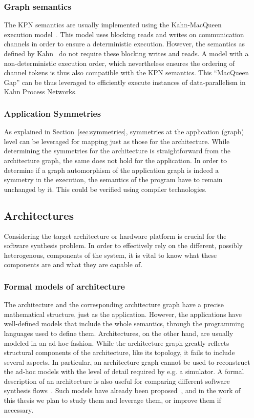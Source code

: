 \documentclass[sigplan,10pt]{acmart}
\begin{document}
\subsubsection{Graph semantics}
The KPN semantics are usually implemented using the Kahn-MacQueen execution model~\cite{kahnmacqueen}. This model uses blocking reads and writes on communication channels in order to ensure a deterministic execution.
However, the semantics as defined by Kahn~\cite{kahn74} do not require these blocking writes and reads. A model with a non-deterministic execution order, which nevertheless ensures the ordering of channel tokens is thus also compatible with the KPN semantics.
This ``MacQueen Gap'' can be thus leveraged to efficiently execute instances of data-parallelism in Kahn Process Networks.

\subsubsection{Application Symmetries}
As explained in Section~\ref{sec:symmetries}, symmetries at the application (graph) level can be leveraged for mapping just as those for the architecture.
While determining the symmetries for the architecture is straightforward from the architecture graph, the same does not hold for the application.
In order to determine if a graph automorphism of the application graph is indeed a symmetry in the execution, the semantics of the program have to remain unchanged by it. 
This could be verified using compiler technologies.

\subsection{Architectures}
Considering the target architecture or hardware platform is crucial for the software synthesis problem.
In order to effectively rely on the different, possibly heterogenous, components of the system, it is vital to know what these components are and what they are capable of.


\subsubsection{Formal models of architecture}
The architecture and the corresponding architecture graph have a precise mathematical structure, just as the application. However, the applications have well-defined models that include the whole semantics, through the programming languages used to define them.
Architectures, on the other hand, are usually modeled in an ad-hoc fashion. While the architecture graph greatly reflects structural components of the architecture, like its topology, it fails to include several aspects.
In particular, an architecture graph cannot be used to reconstruct the ad-hoc models with the level of detail required by e.g. a simulator.
A formal description of an architecture is also useful for comparing different software synthesis flows~\cite{goens_mcsoc16}.
Such models have already been proposed~\cite{moa}, and in the work of this thesis we plan to study them and leverage them, or improve them if necessary.
\end{document}

